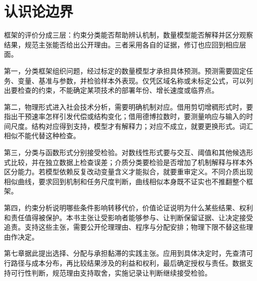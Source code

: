 \section{认识论边界}

框架的评价分成三层：约束分类能否帮助辨认机制，数量模型能否解释并区分观察结果，规范主张能否给出公开理由。三者采用各自的证据，修订也应回到相应层面。

第一，分类框架组织问题，经过标定的数量模型才承担具体预测。预测需要固定任务、变量、基准与参数，并检验样本外表现。仅凭区域名称或未标定公式，可以列出要检查的约束，不能确定某项技术的部署年份、增长速度或临界点。

第二，物理形式进入社会技术分析，需要明确机制对应。借用剪切增稠形式时，要指出干预速率怎样引发代偿或结构变化；借用德博拉数时，要测量响应与输入的时间尺度。结构对应得到支持，模型才有解释力；对应不成立，就要更换形式。词汇相似不能代替这种检查。

第三，分类与函数形式分别接受检验。对数线性形式要与交互、阈值和其他候选形式比较，并在独立数据上检查误差；介质分类要检验是否增加了机制解释与样本外区分能力。若模型依赖反复改动变量含义才能拟合，就要重审定义。不同介质出现相似曲线，要求回到机制和任务尺度判断，曲线相似本身既不证实也不推翻整个框架。

第四，约束分析说明哪些条件影响转移代价，价值论证说明为什么某些结果、权利和责任值得被保护。本书主张让受影响者能够参与、让判断保留证据、让决定接受追责。支持这些主张，需要公开伦理理由、程序与分配安排；物理下限不替这些理由作决定。

第七章据此提出选择、分配与承担黏滞的实践主张。应用到具体决定时，先查清可行路径与成本分布，再比较结果涉及的利益和权利，最后确定授权与责任。数据支持可行性判断，规范理由支持取舍，实施记录让判断继续接受检验。



\printbibliography[heading=subbibliography,title=参考文献]

